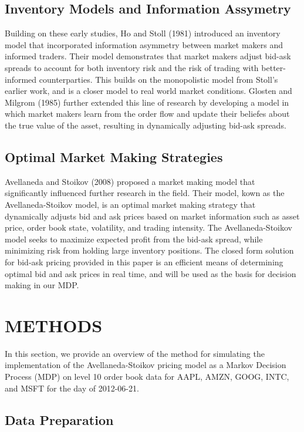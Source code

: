 \documentclass[letterpaper, 10 pt, conference]{ieeeconf}  %
\begin{document}
\subsection{Inventory Models and Information Assymetry}
Building on these early studies, Ho and Stoll (1981)\cite{c3} introduced an inventory model that incorporated information asymmetry between market makers and informed traders. Their model demonstrates that market makers adjust bid-ask spreads to account for both inventory risk and the risk of trading with better-informed counterparties. This builds on the monopolistic model from Stoll's earlier work, and is a closer model to real world market conditions. Glosten and Milgrom (1985)\cite{c4} further extended this line of research by developing a model in which market makers learn from the order flow and update their beliefes about the true value of the asset, resulting in dynamically adjusting bid-ask spreads.

\subsection{Optimal Market Making Strategies}
Avellaneda and Stoikov (2008)\cite{c5} proposed a market making model that significantly influenced further research in the field. Their model, kown as the Avellaneda-Stoikov model, is an optimal market making strategy that dynamically adjusts bid and ask prices based on market information such as asset price, order book state, volatility, and trading intensity. The Avellaneda-Stoikov model seeks to maximize expected profit from the bid-ask spread, while minimizing risk from holding large inventory positions. The closed form solution for bid-ask pricing provided in this paper is an efficient means of determining optimal bid and ask prices in real time, and will be used as the basis for decision making in our MDP.  



\section{METHODS}

In this section, we provide an overview of the method for simulating the implementation of the Avellaneda-Stoikov pricing model as a Markov Decision Process (MDP) on level 10 order book data for AAPL, AMZN, GOOG, INTC, and MSFT for the day of 2012-06-21. 

\subsection{Data Preparation}
\end{document}
